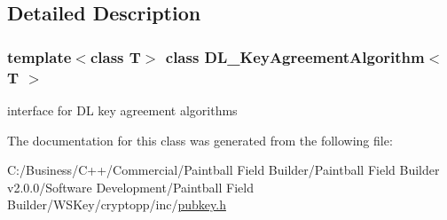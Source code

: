 \subsection{Detailed Description}
\subsubsection*{template$<$class T$>$ class DL\_\-KeyAgreementAlgorithm$<$ T $>$}

interface for DL key agreement algorithms 

The documentation for this class was generated from the following file:\begin{DoxyCompactItemize}
\item 
C:/Business/C++/Commercial/Paintball Field Builder/Paintball Field Builder v2.0.0/Software Development/Paintball Field Builder/WSKey/cryptopp/inc/\hyperlink{pubkey_8h}{pubkey.h}\end{DoxyCompactItemize}
